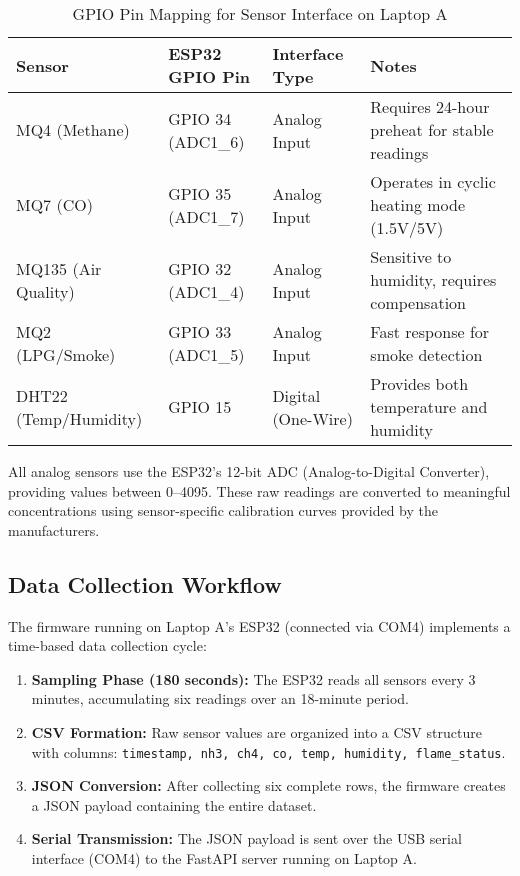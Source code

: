 \begin{table}[H]
\centering
\caption{GPIO Pin Mapping for Sensor Interface on Laptop A}
\label{tab:gpio_mapping}
\begin{tabular}{|p{3cm}|p{2.5cm}|p{2.5cm}|p{5cm}|}
\hline
\textbf{Sensor} & \textbf{ESP32 GPIO Pin} & \textbf{Interface Type} & \textbf{Notes} \\
\hline
MQ4 (Methane) & GPIO 34 (ADC1\_6) & Analog Input & Requires 24-hour preheat for stable readings \\
\hline
MQ7 (CO) & GPIO 35 (ADC1\_7) & Analog Input & Operates in cyclic heating mode (1.5V/5V) \\
\hline
MQ135 (Air Quality) & GPIO 32 (ADC1\_4) & Analog Input & Sensitive to humidity, requires compensation \\
\hline
MQ2 (LPG/Smoke) & GPIO 33 (ADC1\_5) & Analog Input & Fast response for smoke detection \\
\hline
DHT22 (Temp/Humidity) & GPIO 15 & Digital (One-Wire) & Provides both temperature and humidity \\
\hline
\end{tabular}
\end{table}

All analog sensors use the ESP32's 12-bit ADC (Analog-to-Digital Converter), providing values between 0–4095. These raw readings are converted to meaningful concentrations using sensor-specific calibration curves provided by the manufacturers.

\subsection{Data Collection Workflow}

The firmware running on Laptop A's ESP32 (connected via COM4) implements a time-based data collection cycle:

\begin{enumerate}
    \item \textbf{Sampling Phase (180 seconds):} The ESP32 reads all sensors every 3 minutes, accumulating six readings over an 18-minute period.
    \item \textbf{CSV Formation:} Raw sensor values are organized into a CSV structure with columns: \texttt{timestamp, nh3, ch4, co, temp, humidity, flame\_status}.
    \item \textbf{JSON Conversion:} After collecting six complete rows, the firmware creates a JSON payload containing the entire dataset.
    \item \textbf{Serial Transmission:} The JSON payload is sent over the USB serial interface (COM4) to the FastAPI server running on Laptop A.
\end{enumerate}


